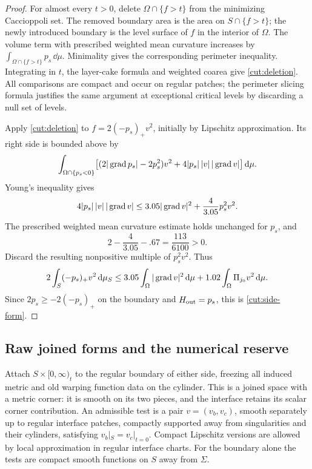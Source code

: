 \begin{proof}
For almost every $t>0$, delete $\Omega\cap\{f>t\}$ from the minimizing
Caccioppoli set.  The removed boundary area is the area on $S\cap\{f>t\}$;
the newly introduced boundary is the level surface of $f$ in the
interior of $\Omega$.  The volume term with prescribed weighted mean curvature increases by
$\int_{\Omega\cap\{f>t\}}p_s\,\dd\mu$.  Minimality gives the
corresponding perimeter inequality.  Integrating in $t$, the layer-cake
formula and weighted coarea give \eqref{cut:deletion}.  All comparisons
are compact and occur on regular patches; the perimeter slicing formula
justifies the same argument at exceptional critical levels by discarding
a null set of levels.

Apply \eqref{cut:deletion} to $f=2(-p_s)_+v^2$, initially by Lipschitz
approximation.  Its right side is bounded above by
\[
 \int_{\Omega\cap\{p_s<0\}}
       \bigl[(2|\operatorname{grad} p_s|-2p_s^2)v^2
                         +4|p_s|\,|v|\,|\operatorname{grad} v|\bigr]\,\mathrm d\mu.
\]
Young's inequality gives
\[
 4|p_s|\,|v|\,|\operatorname{grad} v|
        \le3.05|\operatorname{grad} v|^2+\frac4{3.05}p_s^2v^2.
\]
The prescribed weighted mean curvature estimate holds unchanged for $p_s$, and
\begin{equation}\label{cut:young-margin}
                2-\frac4{3.05}-.67=\frac{113}{6100}>0.
\end{equation}
Discard the resulting nonpositive multiple of $p_s^2v^2$.  Thus
\[
 2\int_S(-p_s)_+v^2\,\mathrm d\mu_S
 \le3.05\int_\Omega|\operatorname{grad} v|^2\,\mathrm d\mu
                  +1.02\int_\Omega\Pi_{j_0}v^2\,\mathrm d\mu.
\]
Since $2p_s\ge-2(-p_s)_+$ on the boundary and
$H_{\rm out}=p_s$, this is \eqref{cut:side-form}.
\end{proof}

\subsection{Raw joined forms and the numerical reserve}

Attach $S\times[0,\infty)_t$ to the regular boundary of either side,
freezing all induced metric and old warping function data on the cylinder.  This
is a joined space with a metric corner: it is smooth on its two pieces, and the interface
retains its scalar corner contribution.  An admissible test is a pair
$v=(v_b,v_c)$, smooth separately up to regular interface patches, compactly
supported away from singularities and their cylinders, satisfying
$v_b|_S=v_c|_{t=0}$.  Compact Lipschitz versions are allowed by local
approximation in regular interface charts.  For the boundary alone the tests are
compact smooth functions on $S$ away from $\Sigma$.

